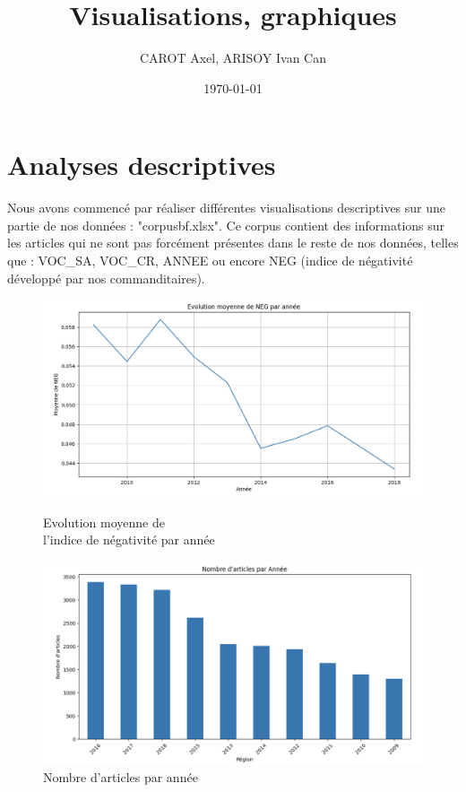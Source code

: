 \documentclass{article}
\title{Visualisations, graphiques}
\author{CAROT Axel, ARISOY Ivan Can}
\date{\today}
\begin{document}
\maketitle

\section{Analyses descriptives}
Nous avons commencé par réaliser différentes visualisations descriptives sur une partie de nos données : "corpusbf.xlsx". Ce corpus contient des informations sur les articles qui ne sont pas forcément présentes dans le reste de nos données, telles que : VOC_SA, VOC_CR, ANNEE ou encore NEG (indice de négativité développé par nos commanditaires).

\begin{figure}[h]
    \centering
    \begin{minipage}{.45\textwidth}
        \centering
        \includegraphics[width=0.9\linewidth]{evol_neg.png}
        \caption{Evolution moyenne de \\l'indice de négativité par année}
        \label{fig:Evolution moyenne de l'indice de négativité par année}
    \end{minipage}%
    \begin{minipage}{.5\textwidth}
        \centering
        \includegraphics[width=0.9\linewidth]{nb_article_annee.png}
        \caption{Nombre d'articles par année}
        \label{fig:Nombre d'articles par année}
    \end{minipage}
\end{figure}
\end{document}
